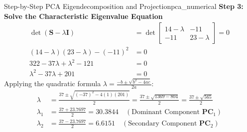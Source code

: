 \begin{example}{Step-by-Step PCA Eigendecomposition and Projection}{pca_numerical}
\textbf{Step 3: Solve the Characteristic Eigenvalue Equation}
\begin{align*}
    \det(\mathbf{S} - \lambda \mathbf{I}) &= \det\begin{bmatrix}
    14 - \lambda & -11 \\
    -11 & 23 - \lambda
    \end{bmatrix} = 0 \\[4pt]
    (14 - \lambda)(23 - \lambda) - (-11)^2 &= 0 \\[4pt]
    322 - 37\lambda + \lambda^2 - 121 &= 0 \\[4pt]
    \lambda^2 - 37\lambda + 201 &= 0
\end{align*}
Applying the quadratic formula $\lambda = \frac{-b \pm \sqrt{b^2 - 4ac}}{2a}$:
\begin{align*}
    \lambda &= \frac{37 \pm \sqrt{(-37)^2 - 4(1)(201)}}{2} = \frac{37 \pm \sqrt{1369 - 804}}{2} = \frac{37 \pm \sqrt{565}}{2} \\[4pt]
    \lambda_1 &= \frac{37 + 23.7697}{2} = \mathbf{30.3844} \quad (\text{Dominant Component } \mathbf{PC}_1) \\[4pt]
    \lambda_2 &= \frac{37 - 23.7697}{2} = \mathbf{6.6151} \quad (\text{Secondary Component } \mathbf{PC}_2)
\end{align*}


\end{example}

